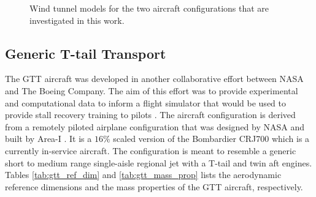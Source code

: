 \begin{figure}
\center
{}
\caption{Wind tunnel models for the two aircraft configurations that are investigated in this work.}\label{fig:aircraft_images}
\end{figure}

\subsection{Generic T-tail Transport}

The GTT aircraft was developed in another collaborative effort between NASA and The Boeing Company. 
The aim of this effort was to provide experimental and computational data to inform a flight simulator that would be used to provide stall recovery training to pilots \cite{cunningham_generic_2018}.
The aircraft configuration is derived from a remotely piloted airplane configuration that was designed by NASA and built by Area-I \cite{kuehme_flight_2014}.
It is a $16\%$ scaled version of the Bombardier CRJ700 which is a currently in-service aircraft.
The configuration is meant to resemble a generic short to medium range single-aisle regional jet with a T-tail and twin aft engines.
Tables \ref{tab:gtt_ref_dim} and \ref{tab:gtt_mass_prop} lists the aerodynamic reference dimensions and the mass properties of the GTT aircraft, respectively.

